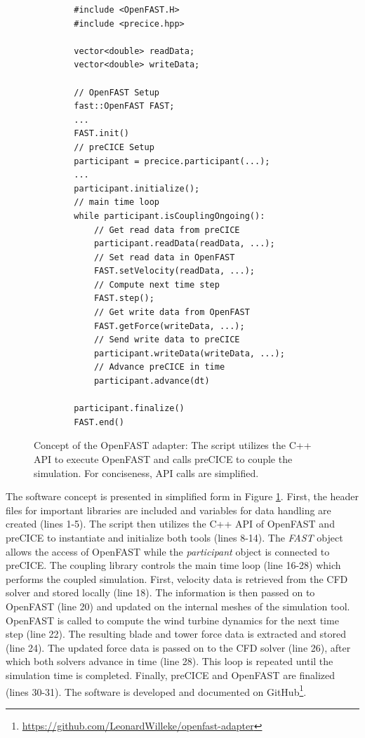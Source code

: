 \begin{figure}[b!]
	\centering
	\begin{minipage}{0.9\textwidth}
		\begin{verbatim}
		#include <OpenFAST.H>
		#include <precice.hpp>
		
		vector<double> readData;
		vector<double> writeData;
		
		// OpenFAST Setup
		fast::OpenFAST FAST;
		...
		FAST.init()
		// preCICE Setup
		participant = precice.participant(...);
		...
		participant.initialize();
		// main time loop
		while participant.isCouplingOngoing(): 
			// Get read data from preCICE
			participant.readData(readData, ...);
			// Set read data in OpenFAST
			FAST.setVelocity(readData, ...);
			// Compute next time step
			FAST.step();
			// Get write data from OpenFAST
			FAST.getForce(writeData, ...);
			// Send write data to preCICE
			participant.writeData(writeData, ...);
			// Advance preCICE in time
			participant.advance(dt) 
		
		participant.finalize()
		FAST.end()
		\end{verbatim}
	\end{minipage}
	\caption{Concept of the OpenFAST adapter: The script utilizes the C++ API to execute OpenFAST and calls preCICE to couple the simulation. For conciseness, API calls are simplified.}
	\label{code:adapter}
\end{figure}

The software concept is presented in simplified form in Figure \ref{code:adapter}. First, the header files for important libraries are included and variables for data handling are created (lines 1-5). The script then utilizes the C++ API of OpenFAST and preCICE to instantiate and initialize both tools (lines 8-14). The \textit{FAST} object allows the access of OpenFAST while the \textit{participant} object is connected to preCICE. The coupling library controls the main time loop (line 16-28) which performs the coupled simulation. First, velocity data is retrieved from the CFD solver and stored locally (line 18). The information is then passed on to OpenFAST (line 20) and updated on the internal meshes of the simulation tool. OpenFAST is called to compute the wind turbine dynamics for the next time step (line 22). The resulting blade and tower force data is extracted and stored (line 24). The updated force data is passed on to the CFD solver (line 26), after which both solvers advance in time (line 28). This loop is repeated until the simulation time is completed. Finally, preCICE and OpenFAST are finalized (lines 30-31). The software is developed and documented on GitHub\footnote{\url{https://github.com/LeonardWilleke/openfast-adapter}}. 